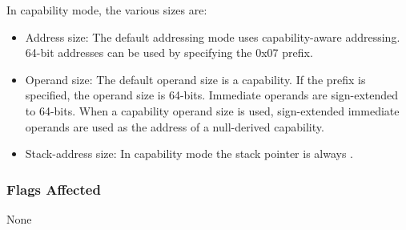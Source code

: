 In capability mode, the various sizes are:

\begin{itemize}
  \item Address size: The default addressing mode uses
    capability-aware addressing.  64-bit addresses can be used by
    specifying the 0x07 prefix.

  \item Operand size: The default operand size is a capability.  If
    the  prefix is specified, the operand size is
    64-bits.  Immediate operands are sign-extended to 64-bits.  When a
    capability operand size is used, sign-extended immediate operands
    are used as the address of a null-derived capability.

  \item Stack-address size: In capability mode the stack pointer is
    always \CSP{}.
\end{itemize}

\subsubsection*{Flags Affected}

None
